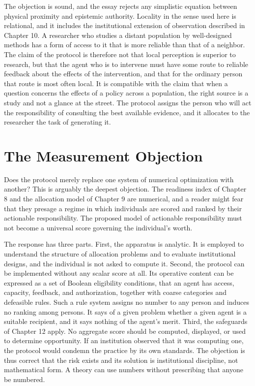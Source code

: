 \documentclass[11pt]{report}
\theoremstyle{definition}
\theoremstyle{remark}
\begin{document}
The objection is sound, and the essay rejects any simplistic equation between physical proximity and epistemic authority. Locality in the sense used here is relational, and it includes the institutional extension of observation described in Chapter 10. A researcher who studies a distant population by well-designed methods has a form of access to it that is more reliable than that of a neighbor. The claim of the protocol is therefore not that local perception is superior to research, but that the agent who is to intervene must have some route to reliable feedback about the effects of the intervention, and that for the ordinary person that route is most often local. It is compatible with the claim that when a question concerns the effects of a policy across a population, the right source is a study and not a glance at the street. The protocol assigns the person who will act the responsibility of consulting the best available evidence, and it allocates to the researcher the task of generating it.

\section{The Measurement Objection}

Does the protocol merely replace one system of numerical optimization with another? This is arguably the deepest objection. The readiness index of Chapter 8 and the allocation model of Chapter 9 are numerical, and a reader might fear that they presage a regime in which individuals are scored and ranked by their actionable responsibility. The proposed model of actionable responsibility must not become a universal score governing the individual's worth.

The response has three parts. First, the apparatus is analytic. It is employed to understand the structure of allocation problems and to evaluate institutional designs, and the individual is not asked to compute it. Second, the protocol can be implemented without any scalar score at all. Its operative content can be expressed as a set of Boolean eligibility conditions, that an agent has access, capacity, feedback, and authorization, together with coarse categories and defeasible rules. Such a rule system assigns no number to any person and induces no ranking among persons. It says of a given problem whether a given agent is a suitable recipient, and it says nothing of the agent's merit. Third, the safeguards of Chapter 12 apply. No aggregate score should be computed, displayed, or used to determine opportunity. If an institution observed that it was computing one, the protocol would condemn the practice by its own standards. The objection is thus correct that the risk exists and its solution is institutional discipline, not mathematical form. A theory can use numbers without prescribing that anyone be numbered.
\end{document}
